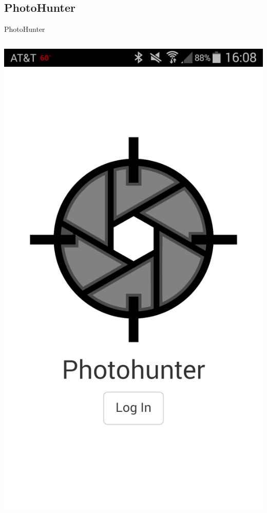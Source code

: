 \documentclass[aspectratio=169]{beamer}
\begin{document}
\subsection{PhotoHunter}

\begin{frame}{PhotoHunter}
  \begin{columns}[c]
    \begin{column}{0.5\columnwidth}
      \centering
      \includegraphics[width=\textwidth,height=\textheight,keepaspectratio]{photohunter/login}

\end{column}
\end{columns}
\end{frame}
\end{document}
